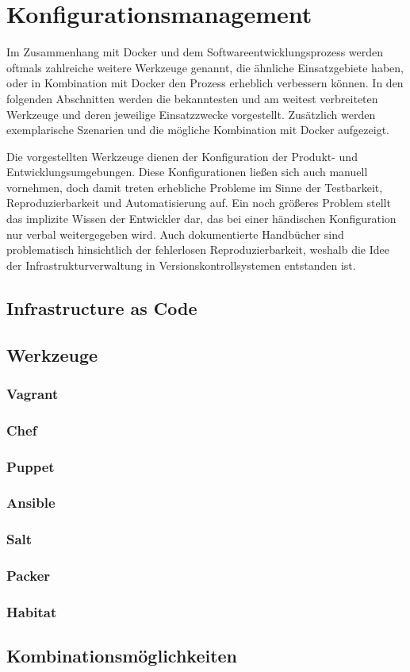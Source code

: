 \chapter{Konfigurationsmanagement}
Im Zusammenhang mit Docker und dem Softwareentwicklungsprozess werden oftmals zahlreiche weitere Werkzeuge genannt, die ähnliche Einsatzgebiete haben, oder in Kombination mit Docker den Prozess erheblich verbessern können. In den folgenden Abschnitten werden die bekanntesten und am weitest verbreiteten Werkzeuge und deren jeweilige Einsatzzwecke vorgestellt. Zusätzlich werden exemplarische Szenarien und die mögliche Kombination mit Docker aufgezeigt.

Die vorgestellten Werkzeuge dienen der Konfiguration der Produkt- und Entwicklungsumgebungen.
Diese Konfigurationen ließen sich auch manuell vornehmen, doch damit treten erhebliche Probleme im Sinne der Testbarkeit, Reproduzierbarkeit und Automatisierung auf.
Ein noch größeres Problem stellt das implizite Wissen der Entwickler dar, das bei einer händischen Konfiguration nur verbal weitergegeben wird.
Auch dokumentierte Handbücher sind problematisch hinsichtlich der fehlerlosen Reproduzierbarkeit, weshalb die Idee der Infrastrukturverwaltung in Versionskontrollsystemen entstanden ist.  

\section{Infrastructure as Code}

\section{Werkzeuge}
\subsection{Vagrant}
\subsection{Chef}
\subsection{Puppet}
\subsection{Ansible}
\subsection{Salt}
\subsection{Packer}
\subsection{Habitat}

\section{Kombinationsmöglichkeiten}
